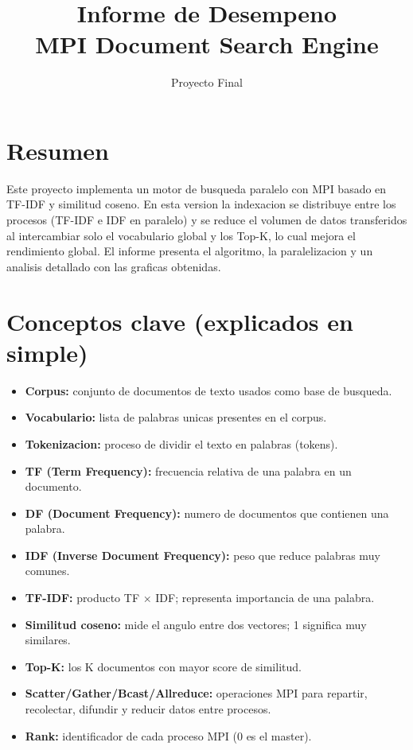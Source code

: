 \documentclass[11pt]{article}
\title{Informe de Desempeno\\MPI Document Search Engine}
\author{Proyecto Final}
\date{}
\begin{document}
\maketitle

\section{Resumen}
Este proyecto implementa un motor de busqueda paralelo con MPI basado en
TF-IDF y similitud coseno. En esta version la indexacion se distribuye entre
los procesos (TF-IDF e IDF en paralelo) y se reduce el volumen de datos
transferidos al intercambiar solo el vocabulario global y los Top-K, lo cual
mejora el rendimiento global. El informe presenta el algoritmo, la
paralelizacion y un analisis detallado con las graficas obtenidas.

\section{Conceptos clave (explicados en simple)}
\begin{itemize}
  \item \textbf{Corpus:} conjunto de documentos de texto usados como base de busqueda.
  \item \textbf{Vocabulario:} lista de palabras unicas presentes en el corpus.
  \item \textbf{Tokenizacion:} proceso de dividir el texto en palabras (tokens).
  \item \textbf{TF (Term Frequency):} frecuencia relativa de una palabra en un documento.
  \item \textbf{DF (Document Frequency):} numero de documentos que contienen una palabra.
  \item \textbf{IDF (Inverse Document Frequency):} peso que reduce palabras muy comunes.
  \item \textbf{TF-IDF:} producto TF $\times$ IDF; representa importancia de una palabra.
  \item \textbf{Similitud coseno:} mide el angulo entre dos vectores; 1 significa muy similares.
  \item \textbf{Top-K:} los K documentos con mayor score de similitud.
  \item \textbf{Scatter/Gather/Bcast/Allreduce:} operaciones MPI para repartir,
  recolectar, difundir y reducir datos entre procesos.
  \item \textbf{Rank:} identificador de cada proceso MPI (0 es el master).
\end{itemize}
\end{document}
